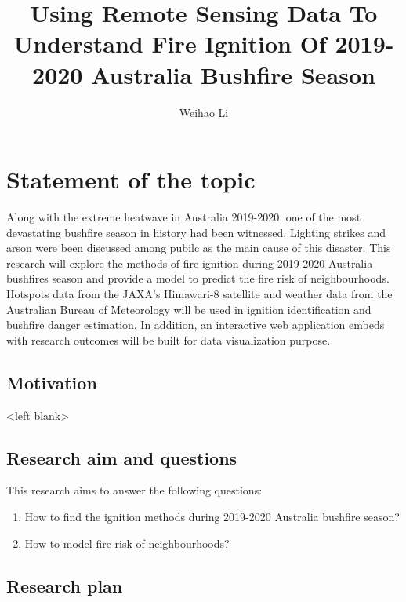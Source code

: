 \documentclass{monashthesis}
\author{Weihao Li}
\title{Using Remote Sensing Data To Understand Fire Ignition Of 2019-2020
Australia Bushfire Season}
\begin{document}

\titlepage

{\sf\tighttoc\doublespacing}

\clearpage{}\setcounter{page}{0}

\chapter{Statement of the topic}\label{ch:intro}

Along with the extreme heatwave in Australia 2019-2020, one of the most
devastating bushfire season in history had been witnessed. Lighting
strikes and arson were been discussed among pubilc as the main cause of
this disaster. This research will explore the methods of fire ignition
during 2019-2020 Australia bushfires season and provide a model to
predict the fire risk of neighbourhoods. Hotspots data from the JAXA's
Himawari-8 satellite and weather data from the Australian Bureau of
Meteorology will be used in ignition identification and bushfire danger
estimation. In addition, an interactive web application embeds with
research outcomes will be built for data visualization purpose.

\section{Motivation}\label{motivation}

\textless{}left blank\textgreater{}

\section{Research aim and questions}\label{research-aim-and-questions}

This research aims to answer the following questions:

\begin{enumerate}
\def\labelenumi{\arabic{enumi}.}
\tightlist
\item
  How to find the ignition methods during 2019-2020 Australia bushfire
  season?
\item
  How to model fire risk of neighbourhoods?
\end{enumerate}

\section{Research plan}\label{research-plan}
\end{document}
